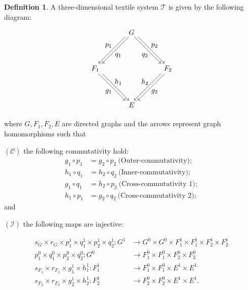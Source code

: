 \documentclass[a4paper,reqno,12pt]{amsart}
\theoremstyle{definition}
\newtheorem{dfn}[thm]{Definition}
\theoremstyle{remark}
\begin{document}
\begin{dfn}\label{def 3D textile}
A three-dimensional textile system $\mathcal{T}$ is given by the following diagram:
\[
\begin{tikzpicture}[scale=1.2]
\node[inner sep=2.5pt, circle] (B) at (-1.5,0) {$F_1$};
\node[inner sep=2.5pt, circle] (C) at (1.5,0) {$F_2$};	
\node[inner sep=2.5pt, circle] (D) at (0,-1.5) {$E$};
\node[inner sep=2.5pt, circle] (A) at (0,1.5) {$G$}; 

\draw[transform canvas={xshift=0.6ex}, ->] (A) -- (B);
\draw[transform canvas={xshift=-0.6ex}, ->] (A) -- (B);

\draw[transform canvas={xshift=0.6ex}, ->] (A) -- (C);
\draw[transform canvas={xshift=-0.6ex}, ->] (A) -- (C);

\draw[transform canvas={xshift=0.6ex}, ->] (C) -- (D);
\draw[transform canvas={xshift=-0.6ex}, ->] (C) -- (D);

\draw[transform canvas={xshift=0.6ex}, ->] (B) -- (D);
\draw[transform canvas={xshift=-0.6ex}, ->] (B) -- (D);

\node at (-0.55,0.55) {$q_1$};
\node at (-0.95,0.95) {$p_1$};

\node at (0.55,0.55) {$q_2$};
\node at (0.95,0.95) {$p_2$};

\node at (-0.55,-0.55) {$h_1$};
\node at (-0.95,-0.95) {$g_1$};

\node at (0.55,-0.55) {$h_2$};
\node at (0.95,-0.95) {$g_2$};
\end{tikzpicture}
\]
where $G,F_1,F_2,E$ are directed graphs and the arrows represent graph homomorphisms such that

$(\mathcal{C})$ the following commutativity hold:
\begin{align*}
g_1\circ p_1&=g_2\circ p_2~\text{(Outer-commutativity)};\\
h_1\circ q_1&=h_2\circ q_2~\text{(Inner-commutativity)};\\
g_1\circ q_1&=h_2\circ p_2~\text{(Cross-commutativity 1)};\\
h_1\circ p_1&=g_2\circ q_2~\text{(Cross-commutativity 2)};
\end{align*}
and

$(\mathcal{I})$ the following maps are injective:

\begin{align*}
    s_G\times r_G\times p_1^1\times q_1^1\times p_2^1\times q_2^1: G^1 &\longrightarrow G^0\times G^0\times F_1^1\times F_1^1\times F_2^1\times F_2^1\\
    p_1^0\times q_1^0\times p_2^0\times q_2^0: G^0 &\longrightarrow F_1^0\times F_1^0\times F_2^0\times F_2^0\\
    s_{F_1}\times r_{F_1}\times g_1^1\times h_1^1: F_1^1 &\longrightarrow F_1^0\times F_1^0\times E^1\times E^1\\
    s_{F_2}\times r_{F_2}\times g_2^1\times h_2^1: F_2^1 &\longrightarrow F_2^0\times F_2^0\times E^1\times E^1.
\end{align*}
\end{dfn}
\end{document}

